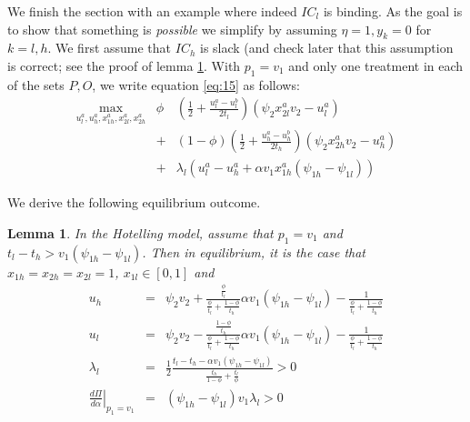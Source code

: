 \documentclass[12pt,english,a4paper]{article}
\newtheorem{lemma}{Lemma}
\begin{document}
We finish the section with an example where indeed \(IC_l\) is binding. As the goal is to show that something is \emph{possible} we simplify by assuming \(\eta=1,y_k=0\) for \(k=l,h\). We first assume that \(IC_h\) is slack (and check later that this assumption is correct; see the proof of lemma \ref{Hotelling_equilibrium}. With \(p_1=v_1\) and only one treatment in each of the sets \(P,O\), we write equation \eqref{eq:15} as follows:
\begin{eqnarray}
\nonumber
    \max_{u_l^a,u_h^a,x_{1h}^a,x_{2l}^a,x_{2h}^a} & \phi& \left(\frac{1}{2} + \frac{u_l^a-u_l^b}{2t_l} \right) (\psi_2 x_{2l}^a v_2 -u_l^a) \\
    \label{eq:20}
     & +& (1-\phi) \left(\frac{1}{2} + \frac{u_h^a-u_h^b}{2t_h} \right) (\psi_2 x_{2h}^a v_2 -u_h^a) \\ \nonumber
     & +& \lambda_l (u_l^a - u_h^a + \alpha v_1 x_{1h}^a (\psi_{1h}-\psi_{1l}))
\end{eqnarray}

We derive the following equilibrium outcome.
\begin{lemma}
\label{Hotelling_equilibrium}
In the Hotelling model, assume that \(p_1 =v_1\) and \(t_l - t_h > v_1 (\psi_{1h}-\psi_{1l})\). Then in equilibrium, it is the case that \(x_{1h}=x_{2h}=x_{2l}=1\), \(x_{1l} \in [0,1]\) and
\begin{eqnarray}
\label{eq:21}
u_h &=& \psi_2 v_2 + \frac{\frac{\phi}{t_l}}{\frac{\phi}{t_l}+\frac{1-\phi}{t_h}}\alpha v_1 (\psi_{1h}-\psi_{1l})- \frac{1}{\frac{\phi}{t_l}+\frac{1-\phi}{t_h}}  \\
\label{eq:21b}
u_l &=& \psi_2 v_2 - \frac{\frac{1-\phi}{t_h}}{\frac{\phi}{t_l}+\frac{1-\phi}{t_h}}\alpha v_1 (\psi_{1h}-\psi_{1l})- \frac{1}{\frac{\phi}{t_l}+\frac{1-\phi}{t_h}}  \\
\label{eq:21c}
\lambda_{l} &=& \frac{1}{2} \frac{t_l-t_h-\alpha v_1 (\psi_{1h}-\psi_{1l})}{\frac{t_h}{1-\phi}+\frac{t_l}{\phi}} > 0 \\
\label{eq:21d}
\left. \frac{d\Pi}{d\alpha}\right|_{p_1=v_1} &=& (\psi_{1h}-\psi_{1l}) v_1 \lambda_l > 0
\end{eqnarray}
\end{lemma}
\end{document}

